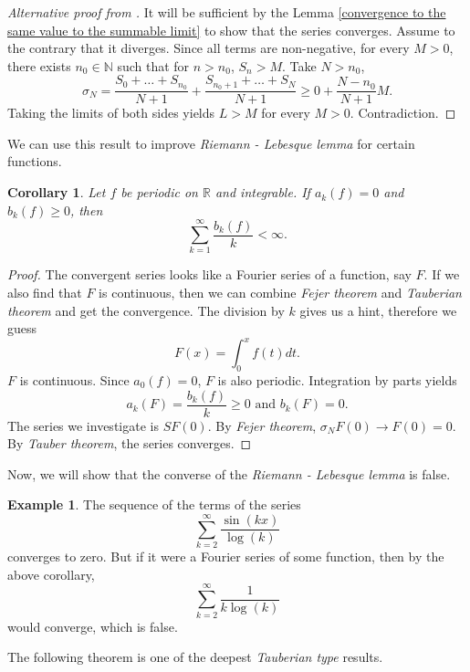 \documentclass[12pt]{amsart}
\newtheorem{corollary}[theorem]{Corollary}
\theoremstyle{definition}
\newtheorem{example}[theorem]{Example}
\newcommand{\NN}{{\mathbb N}} %
\newcommand{\RR}{{\mathbb R}} %
\begin{document}
\begin{proof}[Alternative proof from \cite{Wade}]
    It will be sufficient by the Lemma \ref{convergence to the same value to the summable limit} to show that the series converges. Assume to the contrary that it diverges. Since all terms are non-negative, for every $M > 0$, there exists $n_0 \in \NN$ such that for $n > n_0$, $S_n > M$. Take $ N > n_0$,
    \[
    \sigma_N = \frac{S_0 + \dots + S_{n_0}}{N+1} + \frac{S_{n_0 + 1} + \dots + S_{N}}{N+1} \geq 0 + \frac{N-n_0}{N+1}M.
    \]
    Taking the limits of both sides yields $L > M$ for every $M > 0$. Contradiction.
\end{proof}


We can use this result to improve \emph{Riemann - Lebesque lemma} for certain functions.


\begin{corollary}
    Let $f$ be periodic on $\RR$ and integrable. If $a_k(f) = 0$ and $b_k(f) \geq 0$, then
    \[
    \sum_{k=1}^{\infty}\frac{b_k(f)}{k} < \infty.
    \]
\end{corollary}


\begin{proof}
    The convergent series looks like a Fourier series of a function, say $F$. If we also find that $F$ is continuous, then we can combine \textit{Fejer theorem} and \textit{Tauberian theorem} and get the convergence. The division by $k$ gives us a hint, therefore we guess
    \[
    F(x) = \int_{0}^{x}f(t)dt.
    \]
    $F$ is continuous. Since $a_0(f) = 0$,  $F$ is also periodic. Integration by parts yields
    \[
    a_k(F) = \frac{b_k(f)}{k} \geq 0 \text{ and } b_k(F) = 0.
    \]
    The series we investigate is $SF(0)$. By \emph{Fejer theorem}, $\sigma_NF(0) \to F(0) = 0$. By \emph{Tauber theorem}, the series converges.
\end{proof}


Now, we will show that the converse of the \emph{Riemann - Lebesque lemma} is false.


\begin{example}
    The sequence of the terms of the series
    \[
    \sum_{k=2}^{\infty}\frac{\sin(kx)}{\log(k)}
    \]
    converges to zero. But if it were a Fourier series of some function, then by the above corollary,
    \[
    \sum_{k=2}^{\infty}\frac{1}{k\log(k)}
    \]
    would converge, which is false.
\end{example}


The following theorem is one of the deepest \emph{Tauberian type} results.
\end{document}

